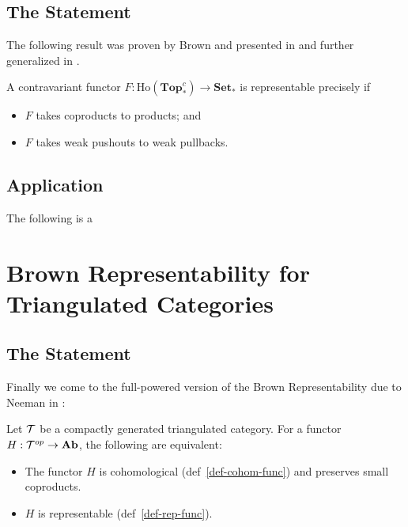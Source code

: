 \documentclass[12pt]{article}
\newcommand*{\pTopc}{\mathbf{Top}_\ast^c}
\begin{document}
\subsection{The Statement}
The following result was proven by Brown and presented in \cite{brown65} and further generalized in \cite{adams71}.
\begin{thm}
	A contravariant functor $F:\text{Ho}(\pTopc)\to\mathbf{Set}_\ast$ is representable precisely if 
	\begin{itemize}
		\item $F$ takes coproducts to products; and 
		\item $F$ takes weak pushouts to weak pullbacks.
	\end{itemize}
\end{thm}

\subsection{Application}
The following is a 

\section{Brown Representability for Triangulated Categories}
\subsection{The Statement}
Finally we come to the full-powered version of the Brown Representability due to Neeman in \cite{neeman-article}:
\begin{thm}[Brown]
	Let $\mathcal{T}$ be a compactly generated triangulated category. For a functor $H:\mathcal{T}^{op}\to\mathbf{Ab}$, the following 
	are equivalent:
	\begin{itemize}
		\item The functor $H$ is cohomological (def~\ref{def-cohom-func}) and preserves small coproducts.
		\item $H$ is representable (def~\ref{def-rep-func}).
	\end{itemize}
\end{thm}

\medskip

\printbibliography
\end{document}
